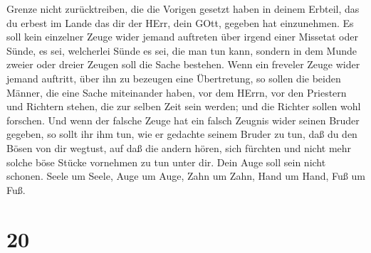 Grenze nicht zurücktreiben, die die Vorigen gesetzt haben in deinem
Erbteil, das du erbest im Lande das dir der HErr, dein GOtt, gegeben hat
einzunehmen.  Es soll kein einzelner Zeuge wider jemand
auftreten über irgend einer Missetat oder Sünde, es sei, welcherlei
Sünde es sei, die man tun kann, sondern in dem Munde zweier oder dreier
Zeugen soll die Sache bestehen.  Wenn ein freveler Zeuge
wider jemand auftritt, über ihn zu bezeugen eine Übertretung,
 so sollen die beiden Männer, die eine Sache miteinander
haben, vor dem HErrn, vor den Priestern und Richtern stehen, die zur
selben Zeit sein werden;  und die Richter sollen wohl
forschen. Und wenn der falsche Zeuge hat ein falsch Zeugnis wider seinen
Bruder gegeben,  so sollt ihr ihm tun, wie er gedachte
seinem Bruder zu tun, daß du den Bösen von dir wegtust, 
auf daß die andern hören, sich fürchten und nicht mehr solche böse
Stücke vornehmen zu tun unter dir.  Dein Auge soll sein
nicht schonen. Seele um Seele, Auge um Auge, Zahn um Zahn, Hand um Hand,
Fuß um Fuß.

\hypertarget{section-19}{%
\section{20}\label{section-19}}

